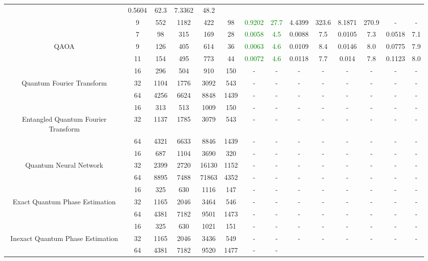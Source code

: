 \begin{table}[htb]
{\begin{tabular}{|c|c|c|c|c|c|c|c|c|c|c|c|c|c|}
 & 0.5604 & 62.3
 & 7.3362 & 48.2
 \\
 & 
9 & 552 & 1182 & 422 & 98
 & \textcolor{green}{0.9202} & \textcolor{green}{27.7}
 & 4.4399 & 323.6
 & 8.1871 & 270.9
 & - & -
 \\
\hline
 & 
7 & 98 & 315 & 169 & 28
 & \textcolor{green}{0.0058} & \textcolor{green}{4.5}
 & 0.0088 & 7.5
 & 0.0105 & 7.3
 & 0.0518 & 7.1
 \\
QAOA & 
9 & 126 & 405 & 614 & 36
 & \textcolor{green}{0.0063} & \textcolor{green}{4.6}
 & 0.0109 & 8.4
 & 0.0146 & 8.0
 & 0.0775 & 7.9
 \\
 & 
11 & 154 & 495 & 773 & 44
 & \textcolor{green}{0.0072} & \textcolor{green}{4.6}
 & 0.0118 & 7.7
 & 0.014 & 7.8
 & 0.1123 & 8.0
 \\
\hline
 & 
16 & 296 & 504 & 910 & 150
 & - & -
 & - & -
 & - & -
 & - & -
 \\
Quantum Fourier Transform & 
32 & 1104 & 1776 & 3092 & 543
 & - & -
 & - & -
 & - & -
 & - & -
 \\
 & 
64 & 4256 & 6624 & 8848 & 1439
 & - & -
 & - & -
 & - & -
 & - & -
 \\
\hline
 & 
16 & 313 & 513 & 1009 & 150
 & - & -
 & - & -
 & - & -
 & - & -
 \\
Entangled Quantum Fourier Transform & 
32 & 1137 & 1785 & 3079 & 543
 & - & -
 & - & -
 & - & -
 & - & -
 \\
 & 
64 & 4321 & 6633 & 8846 & 1439
 & - & -
 & - & -
 & - & -
 & - & -
 \\
\hline
 & 
16 & 687 & 1104 & 3690 & 320
 & - & -
 & - & -
 & - & -
 & - & -
 \\
Quantum Neural Network & 
32 & 2399 & 2720 & 16130 & 1152
 & - & -
 & - & -
 & - & -
 & - & -
 \\
 & 
64 & 8895 & 7488 & 71863 & 4352
 & - & -
 & - & -
 & - & -
 & - & -
 \\
\hline
 & 
16 & 325 & 630 & 1116 & 147
 & - & -
 & - & -
 & - & -
 & - & -
 \\
Exact Quantum Phase Estimation & 
32 & 1165 & 2046 & 3464 & 546
 & - & -
 & - & -
 & - & -
 & - & -
 \\
 & 
64 & 4381 & 7182 & 9501 & 1473
 & - & -
 & - & -
 & - & -
 & - & -
 \\
\hline
 & 
16 & 325 & 630 & 1021 & 151
 & - & -
 & - & -
 & - & -
 & - & -
 \\
Inexact Quantum Phase Estimation & 
32 & 1165 & 2046 & 3436 & 549
 & - & -
 & - & -
 & - & -
 & - & -
 \\
 & 
64 & 4381 & 7182 & 9520 & 1477
 & - & -

\end{tabular}}
\end{table}
